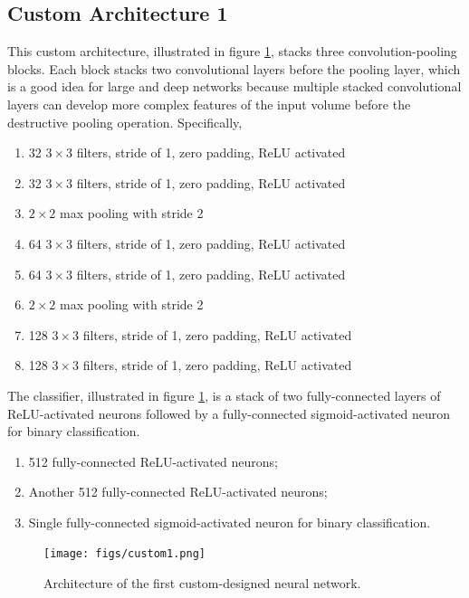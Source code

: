 \subsection{Custom Architecture 1}

This custom architecture, illustrated in figure \ref{fig:custom1}, stacks three convolution-pooling blocks. Each block stacks two convolutional layers before the pooling layer, which is a good idea for large and deep networks because multiple stacked convolutional layers can develop more complex features of the input volume before the destructive pooling operation. Specifically,

\begin{enumerate}
    \item 32 $3 \times 3$ filters, stride of 1, zero padding, ReLU activated
    \item 32 $3 \times 3$ filters, stride of 1, zero padding, ReLU activated
    \item $2 \times 2$ max pooling with stride 2
    \item 64 $3 \times 3$ filters, stride of 1, zero padding, ReLU activated
    \item 64 $3 \times 3$ filters, stride of 1, zero padding, ReLU activated
    \item $2 \times 2$ max pooling with stride 2
    \item 128 $3 \times 3$ filters, stride of 1, zero padding, ReLU activated
    \item 128 $3 \times 3$ filters, stride of 1, zero padding, ReLU activated
\end{enumerate}

The classifier, illustrated in figure \ref{fig:custom1}, is a stack of two fully-connected layers of ReLU-activated neurons followed by a fully-connected sigmoid-activated neuron for binary classification.

\begin{enumerate}
    \item 512 fully-connected ReLU-activated neurons;
    \item Another 512 fully-connected ReLU-activated neurons;
    \item Single fully-connected sigmoid-activated neuron for binary classification.
\end{enumerate}

\begin{figure}[ht]
    \centering
    \texttt{[image: figs/custom1.png]}
    \caption{Architecture of the first custom-designed neural network.}
    \label{fig:custom1}
\end{figure}


